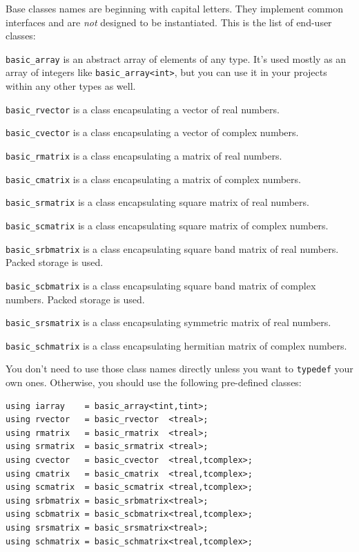 \documentclass[12pt,letterpaper]{article}
\begin{document}
Base classes names are beginning with capital letters. They
implement common interfaces and are \emph{not} designed to be instantiated.
This is the list of end-user classes:
\begin{compactitem}
\item \verb"basic_array" is an abstract array of elements of any type.
It's used
mostly as an array of integers like \verb"basic_array<int>", but you
can use it in your projects within any other types as well.
\item \verb"basic_rvector" is a class encapsulating a vector
of real numbers.
\item \verb"basic_cvector" is a class encapsulating a vector
of complex numbers.
\item \verb"basic_rmatrix" is a class encapsulating a matrix
of real numbers.
\item \verb"basic_cmatrix" is a class encapsulating a matrix
of complex numbers.
\item \verb"basic_srmatrix" is a class encapsulating 
square matrix of real numbers.
\item \verb"basic_scmatrix" is a class encapsulating 
square matrix of complex numbers.
\item \verb"basic_srbmatrix" is a class encapsulating 
square band matrix of real numbers. Packed storage is
used.
\item \verb"basic_scbmatrix" is a class encapsulating 
square band matrix of complex numbers. Packed storage
is used.
\item \verb"basic_srsmatrix" is a class encapsulating 
symmetric matrix of real numbers.
\item \verb"basic_schmatrix" is a class encapsulating 
hermitian matrix of complex numbers.
\end{compactitem}

You don't need to use those class names directly unless you
want to \verb"typedef"
your own ones. Otherwise, you should use the following
pre-defined classes:
\begin{Verbatim}
using iarray    = basic_array<tint,tint>;
using rvector   = basic_rvector  <treal>;
using rmatrix   = basic_rmatrix  <treal>;
using srmatrix  = basic_srmatrix <treal>;
using cvector   = basic_cvector  <treal,tcomplex>;
using cmatrix   = basic_cmatrix  <treal,tcomplex>;
using scmatrix  = basic_scmatrix <treal,tcomplex>;
using srbmatrix = basic_srbmatrix<treal>;
using scbmatrix = basic_scbmatrix<treal,tcomplex>;
using srsmatrix = basic_srsmatrix<treal>;
using schmatrix = basic_schmatrix<treal,tcomplex>;
\end{Verbatim}
\end{document}
